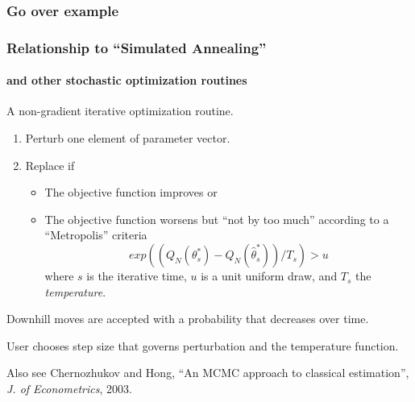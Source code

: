 \documentclass[11pt, aspectratio=169]{beamer}
\newcommand{\Skip}{\vspace{1em}}
\begin{document}
\begin{frame}[c]\frametitle{Go over example}
    


\end{frame}


\begin{frame}[c]\frametitle{Relationship to ``Simulated Annealing''}
\framesubtitle{and other stochastic optimization routines}    

A non-gradient iterative optimization routine. 

\begin{enumerate}
  \item Perturb one element of parameter vector.
  \item Replace if 
  \begin{itemize}
     \item The objective function improves or
     \item The objective function worsens but ``not by too much'' according to a ``Metropolis'' criteria
     $$ exp((Q_N(\theta^*_s) - Q_N(\hat{\theta}^*_s))/T_s) > u$$
     where $s$ is the iterative time, $u$ is a unit uniform draw, and $T_s$ the \emph{temperature}.
   \end{itemize} 
\end{enumerate}

\Skip
Downhill moves are accepted with a probability that decreases over time. 

\Skip
User chooses step size that governs perturbation and the temperature function. 

\Skip
Also see Chernozhukov and Hong, ``An MCMC approach to classical estimation'', \emph{J. of Econometrics}, 2003. 

\end{frame}
\end{document}
